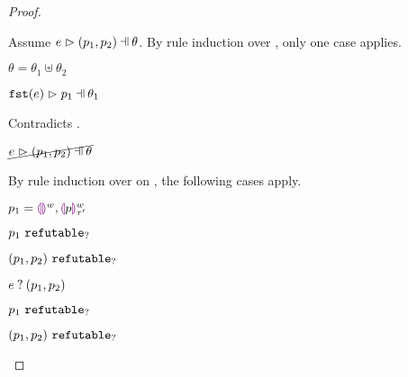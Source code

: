 \begin{proof}
\begin{byCases}
\begin{byCases}
\begin{byCases}
\begin{pfsteps*}
            \end{pfsteps*}
            Assume $\hpatmatch{e}{\hpair{p_1}{p_2}}{\theta}$. By rule induction over , only one case applies.
            \begin{byCases}
            \item[\text{(\ref{rule:MNotIntroPair})}]
                \begin{pfsteps*}
                \item $\theta=\theta_1\uplus\theta_2$ 
                \item $\hpatmatch{\hfst{e}}{p_1}{\theta_1}$  
                \end{pfsteps*}
                Contradicts .
            \end{byCases}
            \begin{pfsteps*}
            \item $\cancel{\hpatmatch{e}{\hpair{p_1}{p_2}}{\theta}}$ 
            \end{pfsteps*}
            By rule induction over  on , the following cases apply.
            \begin{byCases}
            \item[\text{(\ref{rule:MMEHole}),(\ref{rule:MMHole})}]
                \begin{pfsteps*}
                \item $p_1=\textcolor{violet}{\llparenthesis}\textcolor{violet}{\rrparenthesis}^{w},\textcolor{violet}{\llparenthesis} p\textcolor{violet}{\rrparenthesis}^{w}_{\tau'}$ 
                \item $p_1 ~\mathtt{refutable}_?$  
                \item $(p_1 , p_2) ~\mathtt{refutable}_?$  
                \item $e \mathbin{?} (p_1 , p_2)$ 
                \end{pfsteps*}
            \item[\text{(\ref{rule:MMNotIntro})}]
                \begin{pfsteps*}
                \item $p_1 ~\mathtt{refutable}_?$  
                \item $(p_1 , p_2) ~\mathtt{refutable}_?$  

\end{pfsteps*}
\end{byCases}
\end{byCases}
\end{byCases}
\end{byCases}
\end{proof}
